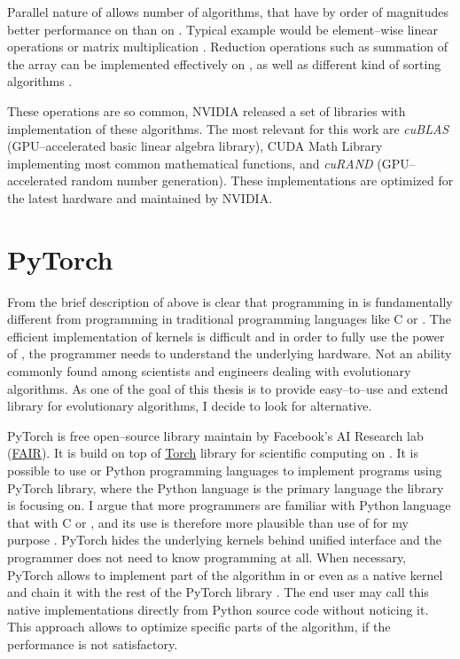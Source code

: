 Parallel nature of \cuda allows number of algorithms, that have by order of magnitudes better performance on \gpu than on \cpuns. Typical example would be element--wise linear operations or matrix multiplication \citep{GPUMatrixMultiplication}. Reduction operations such as summation of the array can be implemented effectively on \gpu \citep{harris2007optimizing}, as well as different kind of sorting algorithms \citep{GPUsorting}.

These operations are so common, NVIDIA released a set of libraries with implementation of these algorithms. The most relevant for this work are \textit{cuBLAS} (GPU--accelerated basic linear algebra library), CUDA Math Library implementing most common mathematical functions, and \textit{cuRAND} (GPU--accelerated random number generation). These implementations are optimized for the latest hardware and maintained by NVIDIA.




\section{PyTorch}

From the brief description of \cuda above is clear that programming in \cuda is fundamentally different from programming in traditional programming languages like C or \cppns. The efficient implementation of kernels is difficult and in order to fully use the power of \gpuns, the programmer needs to understand the underlying hardware. Not an ability commonly found among scientists and engineers dealing with evolutionary algorithms. As one of the goal of this thesis is to provide easy--to--use and extend library for evolutionary algorithms, I decide to look for alternative.

PyTorch is free open--source library maintain by Facebook's AI Research lab (\href{https://ai.facebook.com/}{FAIR}). It is build on top of \href{http://torch.ch/}{Torch} library for scientific computing on \gpuns. It is possible to use \cpp or Python programming languages to implement programs using PyTorch library, where the Python language is the primary language the library is focusing on. I argue that more programmers are familiar with Python language that with C or \cppns, and its use is therefore more plausible than use of \cuda for my purpose \citep{StackOverflowSurvey}. PyTorch hides the underlying kernels behind unified interface and the programmer does not need to know \cuda programming at all. When necessary, PyTorch allows to implement part of the algorithm in \cpp or even as a native \cuda kernel and chain it with the rest of the PyTorch library \citep{PyTorchDoc}. The end user may call this native implementations directly from Python source code without noticing it. This approach allows to optimize specific parts of the algorithm, if the performance is not satisfactory.

